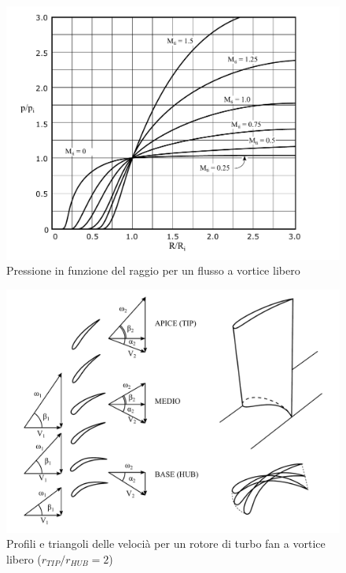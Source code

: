 \begin{figure}
\centering
  \includegraphics[width=\textwidth]{fig/VorticeLibero.pdf}
\caption{Pressione in funzione del raggio per un flusso a vortice libero}
\label{fig:VorticeLibero}
\end{figure}

\begin{figure}
\centering
  \includegraphics[width=\textwidth]{fig/TurboFan.pdf}
\caption{Profili e triangoli delle velocià per un rotore di turbo fan a vortice libero ($r_{TIP}/r_{HUB} =2$)}
\label{fig:TurboFan}
\end{figure}

